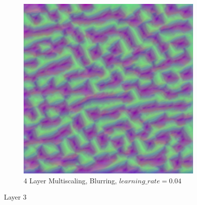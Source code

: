 \begin{figure}
\begin{subfigure}[t]{0.31\textwidth}
    \end{subfigure}
    \hfill
    \begin{subfigure}[t]{0.31\textwidth}
        \captionsetup{justification=centering}
        \centering
        \includegraphics[width=.7\linewidth]{figuras/feat_vis/experiments/layers/initial/l3/random_image_pl4_lr4e-2_layer5.png}
        \caption{4 Layer Multiscaling, Blurring, \(learning\_rate = 0.04\)}
    \end{subfigure}

    \caption{Layer 3}
    \label{fig:layer_3}
\end{figure}

